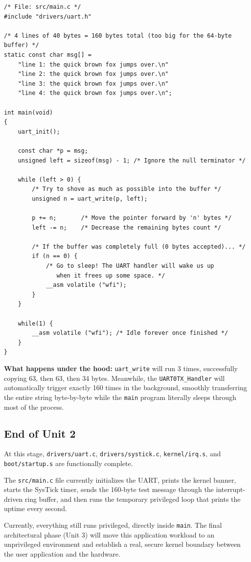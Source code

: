 \begin{lstlisting}
/* File: src/main.c */
#include "drivers/uart.h"

/* 4 lines of 40 bytes = 160 bytes total (too big for the 64-byte buffer) */
static const char msg[] =
    "line 1: the quick brown fox jumps over.\n"
    "line 2: the quick brown fox jumps over.\n"
    "line 3: the quick brown fox jumps over.\n"
    "line 4: the quick brown fox jumps over.\n";

int main(void)
{
    uart_init();
    
    const char *p = msg;
    unsigned left = sizeof(msg) - 1; /* Ignore the null terminator */

    while (left > 0) {
        /* Try to shove as much as possible into the buffer */
        unsigned n = uart_write(p, left); 
        
        p += n;       /* Move the pointer forward by 'n' bytes */
        left -= n;    /* Decrease the remaining bytes count */
        
        /* If the buffer was completely full (0 bytes accepted)... */
        if (n == 0) {
            /* Go to sleep! The UART handler will wake us up 
               when it frees up some space. */
            __asm volatile ("wfi"); 
        }
    }

    while(1) { 
        __asm volatile ("wfi"); /* Idle forever once finished */
    } 
}
\end{lstlisting}
\textbf{What happens under the hood:} \texttt{uart\_write} will run 3 times, successfully copying 63, then 63, then 34 bytes. Meanwhile, the \texttt{UART0TX\_Handler} will automatically trigger exactly 160 times in the background, smoothly transferring the entire string byte-by-byte while the \texttt{main} program literally sleeps through most of the process.

\subsection*{End of Unit 2}
At this stage, \texttt{drivers/uart.c}, \texttt{drivers/systick.c}, \texttt{kernel/irq.s}, and \texttt{boot/startup.s} are functionally complete. 

The \texttt{src/main.c} file currently initializes the UART, prints the kernel banner, starts the SysTick timer, sends the 160-byte test message through the interrupt-driven ring buffer, and then runs the temporary privileged loop that prints the uptime every second. 

Currently, everything still runs privileged, directly inside \texttt{main}. The final architectural phase (Unit 3) will move this application workload to an unprivileged environment and establish a real, secure kernel boundary between the user application and the hardware.

